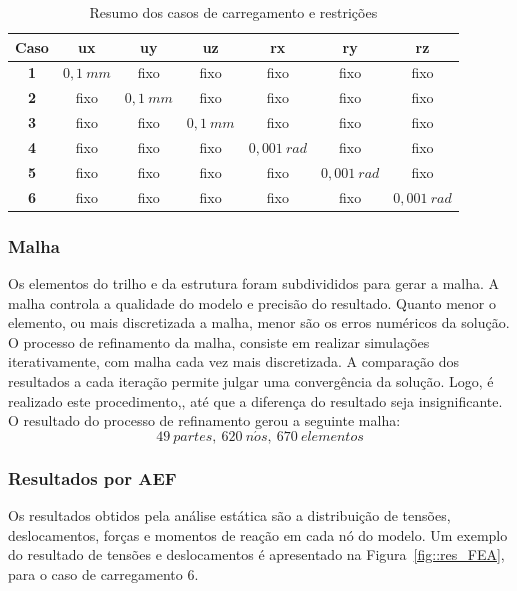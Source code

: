 \begin{table}[h]
\centering
\caption{Resumo dos casos de carregamento e restrições}
\label{tab::casoscarreg}
\begin{tabular}{@{}ccccccc@{}}
\toprule
\textbf{Caso} & \textbf{ux} & \textbf{uy} & \textbf{uz} & \textbf{rx} & \textbf{ry} & \textbf{rz} \\ \midrule
\textbf{1}    & $0,1~mm$           & fixo        & fixo        & fixo        &
fixo & fixo        \\
\textbf{2}    & fixo        & $0,1~mm$            & fixo        & fixo        &
fixo        & fixo        \\
\textbf{3}    & fixo        & fixo        & $0,1~mm$            & fixo        &
fixo        & fixo        \\
\textbf{4}    & fixo        & fixo        & fixo        & $0,001~rad$           
& fixo        & fixo        \\
\textbf{5}    & fixo        & fixo        & fixo        & fixo        &
$0,001~rad$            & fixo        \\
\textbf{6}    & fixo        & fixo        & fixo        & fixo        & fixo    
& $0,001~rad$            \\ \bottomrule
\end{tabular}
\end{table}


\subsubsection{Malha}

Os elementos do trilho e da estrutura foram subdivididos para gerar a malha. A
malha controla a qualidade do modelo e precisão do resultado.
Quanto menor o elemento, ou mais discretizada a malha, menor são os erros
numéricos da solução. O processo de refinamento da malha, consiste em realizar
simulações iterativamente, com malha cada vez mais discretizada. A comparação
dos resultados a cada iteração permite julgar uma convergência da solução. Logo,
é realizado este procedimento,, até que a diferença do resultado seja
insignificante. O resultado do processo de refinamento gerou a seguinte
malha:
%
$$ 49~partes,~ 620~n\acute{o}s,~ 670~elementos $$
%

\subsubsection{Resultados por AEF}

Os resultados obtidos pela análise estática são a distribuição de tensões,
deslocamentos, forças e momentos de reação em cada nó do modelo. Um exemplo do
resultado de tensões e deslocamentos é apresentado na Figura~\ref{fig::res_FEA},
para o caso de carregamento 6.

